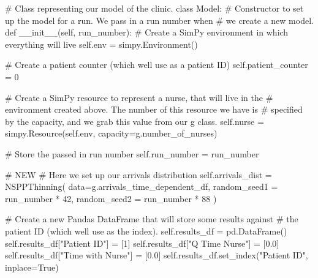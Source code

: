 \documentclass[
  letterpaper,
  DIV=11,
  numbers=noendperiod]{scrreprt}
\newenvironment{Shaded}{}{}
\newcommand{\CommentTok}[1]{\textcolor[rgb]{0.42,0.45,0.49}{#1}}
\newcommand{\DecValTok}[1]{\textcolor[rgb]{0.00,0.36,0.77}{#1}}
\newcommand{\FloatTok}[1]{\textcolor[rgb]{0.00,0.36,0.77}{#1}}
\newcommand{\FunctionTok}[1]{\textcolor[rgb]{0.44,0.26,0.76}{#1}}
\newcommand{\KeywordTok}[1]{\textcolor[rgb]{0.84,0.23,0.29}{#1}}
\newcommand{\NormalTok}[1]{\textcolor[rgb]{0.14,0.16,0.18}{#1}}
\newcommand{\OperatorTok}[1]{\textcolor[rgb]{0.14,0.16,0.18}{#1}}
\newcommand{\StringTok}[1]{\textcolor[rgb]{0.01,0.18,0.38}{#1}}
\newcommand{\VariableTok}[1]{\textcolor[rgb]{0.89,0.38,0.04}{#1}}
\begin{document}
\begin{tcolorbox}
\begin{Shaded}
\begin{Highlighting}[]
\CommentTok{\# Class representing our model of the clinic.}
\KeywordTok{class}\NormalTok{ Model:}
    \CommentTok{\# Constructor to set up the model for a run.  We pass in a run number when}
    \CommentTok{\# we create a new model.}
    \KeywordTok{def} \FunctionTok{\_\_init\_\_}\NormalTok{(}\VariableTok{self}\NormalTok{, run\_number):}
        \CommentTok{\# Create a SimPy environment in which everything will live}
        \VariableTok{self}\NormalTok{.env }\OperatorTok{=}\NormalTok{ simpy.Environment()}

        \CommentTok{\# Create a patient counter (which we\textquotesingle{}ll use as a patient ID)}
        \VariableTok{self}\NormalTok{.patient\_counter }\OperatorTok{=} \DecValTok{0}

        \CommentTok{\# Create a SimPy resource to represent a nurse, that will live in the}
        \CommentTok{\# environment created above.  The number of this resource we have is}
        \CommentTok{\# specified by the capacity, and we grab this value from our g class.}
        \VariableTok{self}\NormalTok{.nurse }\OperatorTok{=}\NormalTok{ simpy.Resource(}\VariableTok{self}\NormalTok{.env, capacity}\OperatorTok{=}\NormalTok{g.number\_of\_nurses)}

        \CommentTok{\# Store the passed in run number}
        \VariableTok{self}\NormalTok{.run\_number }\OperatorTok{=}\NormalTok{ run\_number}

        \CommentTok{\# NEW}
        \CommentTok{\# Here we set up our arrivals distribution}
        \VariableTok{self}\NormalTok{.arrivals\_dist }\OperatorTok{=}\NormalTok{ NSPPThinning(}
\NormalTok{          data}\OperatorTok{=}\NormalTok{g.arrivals\_time\_dependent\_df,}
\NormalTok{          random\_seed1 }\OperatorTok{=}\NormalTok{ run\_number }\OperatorTok{*} \DecValTok{42}\NormalTok{,}
\NormalTok{          random\_seed2 }\OperatorTok{=}\NormalTok{ run\_number }\OperatorTok{*} \DecValTok{88}
\NormalTok{        )}


        \CommentTok{\# Create a new Pandas DataFrame that will store some results against}
        \CommentTok{\# the patient ID (which we\textquotesingle{}ll use as the index).}
        \VariableTok{self}\NormalTok{.results\_df }\OperatorTok{=}\NormalTok{ pd.DataFrame()}
        \VariableTok{self}\NormalTok{.results\_df[}\StringTok{"Patient ID"}\NormalTok{] }\OperatorTok{=}\NormalTok{ [}\DecValTok{1}\NormalTok{]}
        \VariableTok{self}\NormalTok{.results\_df[}\StringTok{"Q Time Nurse"}\NormalTok{] }\OperatorTok{=}\NormalTok{ [}\FloatTok{0.0}\NormalTok{]}
        \VariableTok{self}\NormalTok{.results\_df[}\StringTok{"Time with Nurse"}\NormalTok{] }\OperatorTok{=}\NormalTok{ [}\FloatTok{0.0}\NormalTok{]}
        \VariableTok{self}\NormalTok{.results\_df.set\_index(}\StringTok{"Patient ID"}\NormalTok{, inplace}\OperatorTok{=}\VariableTok{True}\NormalTok{)}


\end{Highlighting}
\end{Shaded}
\end{tcolorbox}
\end{document}
